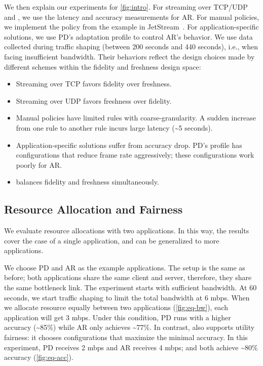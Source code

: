  We then explain our experiments for
\autoref{fig:intro}. For streaming over TCP/UDP and \sysname{}, we use the
latency and accuracy measurements for AR. For manual policies, we implement the
policy from the example in JetStream~\cite{rabkin2014aggregation}. For
application-specific solutions, we use PD's adaptation profile to control AR's
behavior. We use data collected during traffic shaping (between 200 seconds and
440 seconds), i.e., when facing insufficient bandwidth. Their behaviors reflect
the design choices made by different schemes within the fidelity and freshness
design space:

\begin{itemize}[leftmargin=*]
\item Streaming over TCP favors fidelity over freshness.
\item Streaming over UDP favors freshness over fidelity.
\item Manual policies have limited rules with coarse-granularity. A sudden
  increase from one rule to another rule incurs large latency (\textasciitilde 5
  seconds).
\item Application-specific solutions suffer from accuracy drop. PD's profile has
  configurations that reduce frame rate aggressively; these configurations work
  poorly for AR.
\item \sysname{} balances fidelity and freshness simultaneously.
\end{itemize}

\subsection{Resource Allocation and Fairness}
\label{sec:multi-task-alloc}

We evaluate resource allocations with two applications. In this way, the results
cover the case of a single application, and can be generalized to more
applications.

We choose PD and AR as the example applications. The setup is the same as
before; both applications share the same client and server, therefore, they
share the same bottleneck link. The experiment starts with sufficient
bandwidth. At 60 seconds, we start traffic shaping to limit the total bandwidth
at 6 mbps. When we allocate resource equally between two applications
(\autoref{fig:eq-bw}), each application will get 3 mbps. Under this condition,
PD runs with a higher accuracy (\textasciitilde 85\%) while AR only achieves
\textasciitilde 77\%. In contrast, \sysname{} also supports utility fairness: it
chooses configurations that maximize the minimal accuracy. In this experiment,
PD receives 2 mbps and AR receives 4 mbps; and both achieve \textasciitilde 80\%
accuracy (\autoref{fig:eq-acc}).


